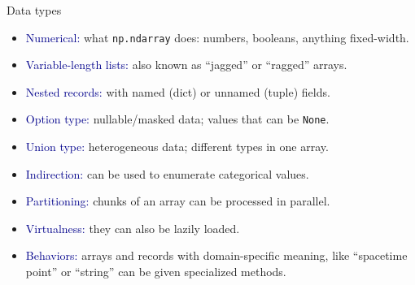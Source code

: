 \documentclass[aspectratio=169]{beamer}
\begin{document}
\begin{frame}{Data types }
\Large
\vspace{0.2 cm}

\begin{itemize}
\item<1-> \textcolor{darkblue}{Numerical:} what \texttt{np.ndarray} does: numbers, booleans, anything fixed-width.
\item<2-> \textcolor{darkblue}{Variable-length lists:} also known as ``jagged'' or ``ragged'' arrays.
\item<3-> \textcolor{darkblue}{Nested records:} with named (dict) or unnamed (tuple) fields.
\item<4-> \textcolor{darkblue}{Option type:} nullable/masked data; values that can be \texttt{None}.
\item<5-> \textcolor{darkblue}{Union type:} heterogeneous data; different types in one array.
\end{itemize}

\vspace{0.25 cm}
\begin{itemize}
\item<6-> \textcolor{darkblue}{Indirection:} can be used to enumerate categorical values.
\item<7-> \textcolor{darkblue}{Partitioning:} chunks of an array can be processed in parallel.
\item<8-> \textcolor{darkblue}{Virtualness:} they can also be lazily loaded.
\item<9-> \textcolor{darkblue}{Behaviors:} arrays and records with domain-specific meaning, like ``spacetime point'' or ``string'' can be given specialized methods.
\end{itemize}
\end{frame}
\end{document}
